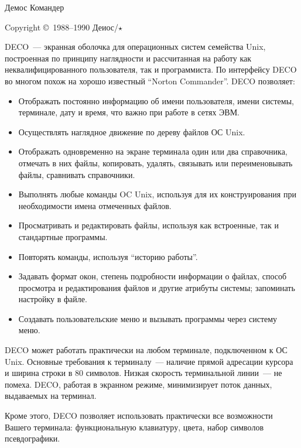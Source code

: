 
\pagestyle{empty}



\centerline{\huge\sf Демос Командер}
\vskip 6pt
\centerline{\sf Copyright \copyright\ 1988--1990 Деиос/$\star$}
\vskip 12pt

DECO~--- экранная оболочка для операционных систем семейства Unix,
построенная по принципу наглядности и рассчитанная на
работу как неквалифицированного пользователя, так и программиста.
По интерфейсу DECO во многом похож на хорошо известный ``Norton Commander''.
DECO позволяет:

\begin{itemize}
\item
Отображать постоянно информацию об имени пользователя, имени системы,
терминале, дату и время, что важно при работе в сетях ЭВМ.
\item
Осуществлять наглядное движение по дереву файлов ОС Unix.
\item
Отображать одновременно на экране терминала один или два справочника,
отмечать в них файлы, копировать, удалять, связывать или переименовывать
файлы, сравнивать справочники.
\item
Выполнять любые команды OC Unix, используя для их конструирования при
необходимости имена отмеченных файлов.
\item
Просматривать и редактировать файлы, используя как встроенные, так и
стандартные программы.
\item
Повторять команды, используя ``историю работы''.
\item
Задавать формат окон, степень подробности информации о файлах,
способ просмотра и редактирования файлов и другие атрибуты системы;
запоминать настройку в файле.
\item
Создавать пользовательские меню и вызывать программы через систему
меню.
\end{itemize}

DECO может работать практически на любом терминале, подключенном к ОС Unix.
Основные требования к терминалу~--- наличие прямой адресации курсора
и ширина строки в 80 символов.  Низкая скорость терминальной линии~---
не помеха. DECO, работая в экранном режиме, минимизирует поток
данных, выдаваемых на терминал.

Кроме этого, DECO позволяет использовать практически все возможности Вашего
терминала: функциональную клавиатуру, цвета, набор символов псевдографики.


